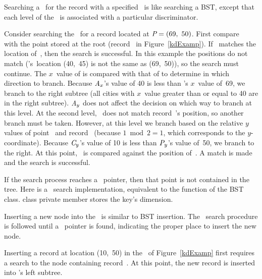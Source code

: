 Searching a \KDtree\ for the record with a specified \XYcoord\
is like searching a BST, except that each level of the
\KDtree\ is associated with a particular discriminator.

\begin{example}
Consider searching the \KDtree\ for a
record located at $ = (69,~50)$.
First compare~ with the point stored at
the root (record~ in Figure~\ref{kdExamp}).
If~\svar{P} matches the location
of~, then the search is successful.
In this example the positions do not match ('s~location
(40,~45) is not the same as (69,~50)), so the search must continue.
The $x$~value of \svar{A} is compared with that of \svar{P} to
determine in which direction to branch.
Because ${\textit{A}}_x$'s value of 40 is less than 's $x$~value
of~69, we branch to the right subtree (all cities with $x$~value
greater than or equal to 40 are in the right subtree).
${\textit{A}}_y$ does not affect the decision on which way to
branch at this level.
At the second level, ~does not match record~'s position,
so another branch must be taken.
However, at this level we branch based on the relative $y$ values of
point~\svar{P} and record~\svar{C} (because $1 \bmod 2 = 1$, which
corresponds to the $y$-coordinate).
Because ${\textit{C}}_y$'s value of 10 is less than ${\textit{P}}_y$'s value
of~50, we branch to the right.
At this point, ~is compared against the position of~.
A match is made and the search is successful.
\end{example}

If the search process reaches a \NULL\ pointer, then
that point is not contained in the tree.
Here is a \KDtree\ search implementation,
equivalent to the  function of the BST class.
 class private member  stores the key's
dimension.

\xproghere{KDfind.book}

Inserting a new node into the \KDtree\ is similar to
BST insertion.
The \KDtree\ search procedure is followed until a \NULL\ pointer is
found, indicating the proper place to insert the new node.

\begin{example}
Inserting a record at location (10,~50) in the
\KDtree\ of Figure~\ref{kdExamp} first requires a search to the node
containing record~.
At this point, the new record is inserted into \svar{B}'s left
subtree.
\end{example}

